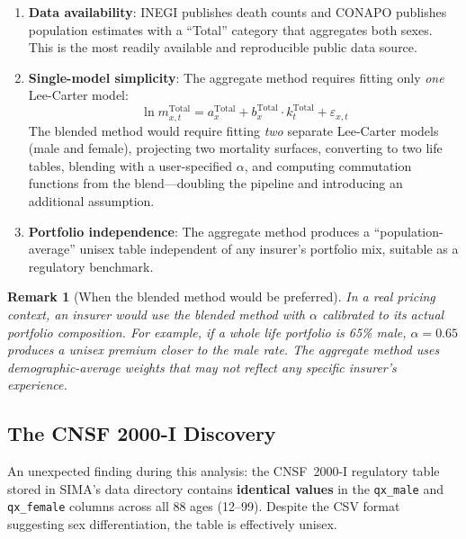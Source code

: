 \documentclass[12pt,a4paper]{article}
\newtheorem{remark}[definition]{Remark}
\newcommand{\mx}[1]{m_{#1}}
\begin{document}
\begin{enumerate}
  \item \textbf{Data availability}: INEGI publishes death counts and CONAPO
        publishes population estimates with a ``Total'' category that aggregates
        both sexes. This is the most readily available and reproducible public
        data source.

  \item \textbf{Single-model simplicity}: The aggregate method requires fitting
        only \emph{one} Lee-Carter model:
        \begin{equation}
          \ln \mx{x,t}^{\text{Total}} = a_x^{\text{Total}} + b_x^{\text{Total}}
          \cdot k_t^{\text{Total}} + \varepsilon_{x,t}
        \end{equation}
        The blended method would require fitting \emph{two} separate Lee-Carter
        models (male and female), projecting two mortality surfaces, converting
        to two life tables, blending with a user-specified $\alpha$, and computing
        commutation functions from the blend---doubling the pipeline and introducing
        an additional assumption.

  \item \textbf{Portfolio independence}: The aggregate method produces a
        ``population-average'' unisex table independent of any insurer's
        portfolio mix, suitable as a regulatory benchmark.
\end{enumerate}

\begin{remark}[When the blended method would be preferred]
In a real pricing context, an insurer would use the blended method with $\alpha$
calibrated to its actual portfolio composition. For example, if a whole life
portfolio is 65\% male, $\alpha = 0.65$ produces a unisex premium closer to the
male rate. The aggregate method uses demographic-average weights that may not
reflect any specific insurer's experience.
\end{remark}

\subsection{The CNSF 2000-I Discovery}
\label{subsec:cnsf-discovery}

An unexpected finding during this analysis: the CNSF~2000-I regulatory table
stored in SIMA's data directory contains \textbf{identical values} in the
\texttt{qx\_male} and \texttt{qx\_female} columns across all 88 ages (12--99).
Despite the CSV format suggesting sex differentiation, the table is effectively
unisex.
\end{document}
